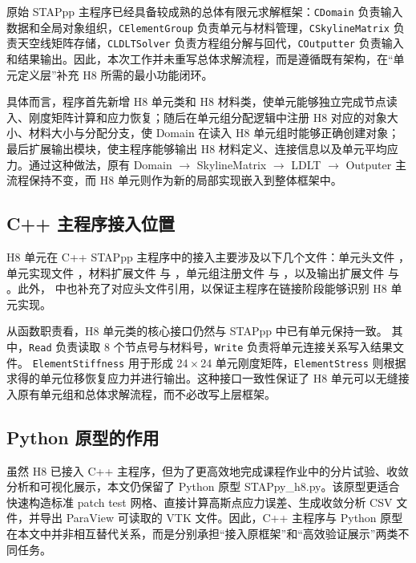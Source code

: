 \documentclass[12pt,a4paper]{article}
\begin{document}
原始 STAPpp 主程序已经具备较成熟的总体有限元求解框架：\texttt{CDomain} 负责输入数据和全局对象组织，\texttt{CElementGroup} 负责单元与材料管理，\texttt{CSkylineMatrix} 负责天空线矩阵存储，\texttt{CLDLTSolver} 负责方程组分解与回代，\texttt{COutputter} 负责输入和结果输出。因此，本次工作并未重写总体求解流程，而是遵循既有架构，在“单元定义层”补充 H8 所需的最小功能闭环。

具体而言，程序首先新增 H8 单元类和 H8 材料类，使单元能够独立完成节点读入、刚度矩阵计算和应力恢复；随后在单元组分配逻辑中注册 H8 对应的对象大小、材料大小与分配分支，使 Domain 在读入 H8 单元组时能够正确创建对象；最后扩展输出模块，使主程序能够输出 H8 材料定义、连接信息以及单元平均应力。通过这种做法，原有 Domain $\rightarrow$ SkylineMatrix $\rightarrow$ LDLT $\rightarrow$ Outputer 主流程保持不变，而 H8 单元则作为新的局部实现嵌入到整体框架中。

\subsection{C++ 主程序接入位置}

H8 单元在 C++ STAPpp 主程序中的接入主要涉及以下几个文件：单元头文件
，单元实现文件 ，材料扩展文件
 与 ，单元组注册文件
 与 ，以及输出扩展文件
 与 。此外，
中也补充了对应头文件引用，以保证主程序在链接阶段能够识别 H8 单元实现。

从函数职责看，H8 单元类的核心接口仍然与 STAPpp 中已有单元保持一致。
其中，\texttt{Read} 负责读取 8 个节点号与材料号，\texttt{Write} 负责将单元连接关系写入结果文件。
\texttt{ElementStiffness} 用于形成 24\,$\times$\,24 单元刚度矩阵，\texttt{ElementStress}
则根据求得的单元位移恢复应力并进行输出。这种接口一致性保证了 H8 单元可以无缝接入原有单元组和总体求解流程，而不必改写上层框架。

\subsection{Python 原型的作用}

虽然 H8 已接入 C++ 主程序，但为了更高效地完成课程作业中的分片试验、收敛分析和可视化展示，本文仍保留了 Python 原型 STAPpy\_h8.py。该原型更适合快速构造标准 patch test 网格、直接计算高斯点应力误差、生成收敛分析 CSV 文件，并导出 ParaView 可读取的 VTK 文件。因此，C++ 主程序与 Python 原型在本文中并非相互替代关系，而是分别承担“接入原框架”和“高效验证展示”两类不同任务。
\end{document}
